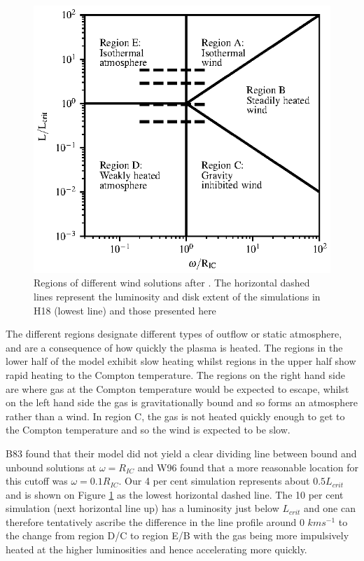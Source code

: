 \documentclass[a4paper,fleqn,usenatbib]{mnras}
\begin{document}
\begin{figure}[h]
\includegraphics[width=\columnwidth]{figures/fig7.eps}
\caption{Regions of different wind solutions after \protect\cite{1983ApJ...271...70B}. The horizontal dashed 
lines represent the luminosity and disk extent of the simulations in H18
(lowest line) and those presented here}
\label{figure:regions}
\end{figure}

The different regions designate different types of outflow or static atmosphere, and are a consequence of
how quickly the plasma is heated. The regions in the lower half of the model exhibit slow heating 
whilst regions in the upper half show rapid heating to the Compton temperature. The regions on the
right hand side are where gas at the Compton temperature would be expected to escape, whilst on the 
left hand side the gas is gravitationally bound and so forms an atmosphere rather than a wind. 
In region C, the gas is not heated quickly enough to get to the Compton temperature and so the 
wind is expected to be slow.

B83 found that their model did not yield a clear dividing line between bound and unbound solutions 
at $\omega=R_{IC}$ and W96 found that a more reasonable location for this cutoff was $\omega=0.1 R_{IC}$.
Our 4 per cent simulation represents about $0.5 L_{crit}$ and is shown on Figure \ref{figure:regions} as the lowest 
horizontal dashed line. The 10 per cent simulation (next horizontal line up) has a luminosity just below $L_{crit}$ 
and one can therefore tentatively ascribe the difference in the line profile around 0 $kms^{-1}$ to the change from 
region D/C to region E/B with the gas being more impulsively heated at the higher luminosities and hence 
accelerating more quickly.
\end{document}
